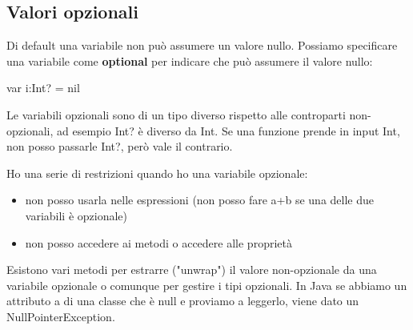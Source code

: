 \subsection{Valori opzionali}
Di default una variabile non può assumere un valore nullo.
Possiamo specificare una variabile come \textbf{optional} per indicare che può assumere il valore nullo:
\begin{Swift}
    var i:Int? = nil 
\end{Swift}
Le variabili opzionali sono di un tipo diverso rispetto alle controparti non-opzionali, ad esempio Int? è diverso da Int. 
Se una funzione prende in input Int, non posso passarle Int?, però vale il contrario. 

Ho una serie di restrizioni quando ho una variabile opzionale:
\begin{itemize}
    \item non posso usarla nelle espressioni (non posso fare a+b se una delle due variabili è opzionale)
    \item non posso accedere ai metodi o accedere alle proprietà
\end{itemize}
Esistono vari metodi per estrarre ("unwrap") il valore non-opzionale da una variabile opzionale o comunque per gestire i tipi opzionali. 
In Java se abbiamo un attributo a di una classe che è null e proviamo a leggerlo, viene dato un NullPointerException.

